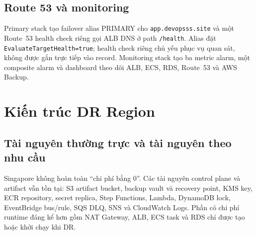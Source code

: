 \subsection{Route 53 và monitoring}

Primary stack tạo failover alias PRIMARY cho \texttt{app.devopsss.site} và một Route~53 health check riêng gọi ALB DNS ở path \texttt{/health}. Alias đặt \texttt{EvaluateTargetHealth=true}; health check riêng chủ yếu phục vụ quan sát, không được gắn trực tiếp vào record. Monitoring stack tạo ba metric alarm, một composite alarm và dashboard theo dõi ALB, ECS, RDS, Route~53 và AWS Backup.

\section{Kiến trúc DR Region}

\subsection{Tài nguyên thường trực và tài nguyên theo nhu cầu}

Singapore không hoàn toàn ``chi phí bằng 0''. Các tài nguyên control plane và artifact vẫn tồn tại: S3 artifact bucket, backup vault và recovery point, KMS key, ECR repository, secret replica, Step Functions, Lambda, DynamoDB lock, EventBridge bus/rule, SQS DLQ, SNS và CloudWatch Logs. Phần có chi phí runtime đáng kể hơn gồm NAT Gateway, ALB, ECS task và RDS chỉ được tạo hoặc khởi chạy khi DR.

